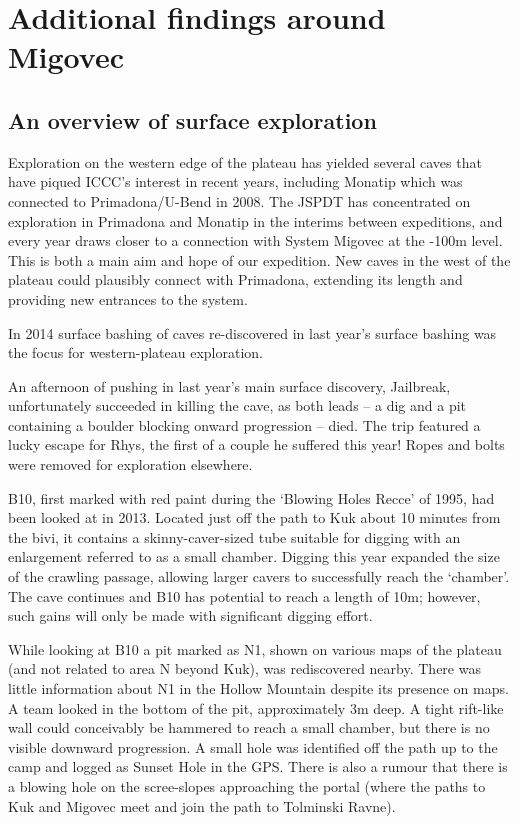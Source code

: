 \section{Additional findings around Migovec}


\subsection{An overview of surface exploration}

Exploration on the western edge of the plateau has yielded several caves that have piqued ICCC’s interest in recent years, including Monatip which was connected to Primadona/U-Bend in 2008. The JSPDT has concentrated on exploration in Primadona and Monatip in the interims between expeditions, and every year draws closer to a connection with System Migovec at the -100m level. This is both a main aim and hope of our expedition. New caves in the west of the plateau could plausibly connect with Primadona, extending its length and providing new entrances to the system.

In 2014 surface bashing of caves re-discovered in last year’s surface bashing was the focus for western-plateau exploration.

An afternoon of pushing in last year’s main surface discovery, Jailbreak, unfortunately succeeded in killing the cave, as both leads – a dig and a pit containing a boulder blocking onward progression – died. The trip featured a lucky escape for Rhys, the first of a couple he suffered this year! Ropes and bolts were removed for exploration elsewhere.

B10, first marked with red paint during the ‘Blowing Holes Recce’ of 1995, had been looked at in 2013. Located just off the path to Kuk about 10 minutes from the bivi, it contains a skinny-caver-sized tube suitable for digging with an enlargement referred to as a small chamber. Digging this year expanded the size of the crawling passage, allowing larger cavers to successfully reach the ‘chamber’. The cave continues and B10 has potential to reach a length of 10m; however, such gains will only be made with significant digging effort. 

While looking at B10 a pit marked as N1, shown on various maps of the plateau (and not related to area N beyond Kuk), was rediscovered nearby. There was little information about N1 in the Hollow Mountain despite its presence on maps. A team looked in the bottom of the pit, approximately 3m deep. A tight rift-like wall could conceivably be hammered to reach a small chamber, but there is no visible downward progression. 
A small hole was identified off the path up to the camp and logged as Sunset Hole in the GPS. There is also a rumour that there is a blowing hole on the scree-slopes approaching the portal (where the paths to Kuk and Migovec meet and join the path to Tolminski Ravne).


